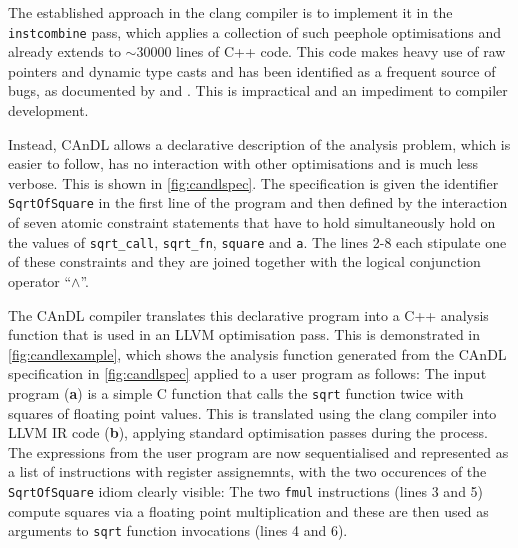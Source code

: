     The established approach in the clang compiler is to implement it in the
    \texttt{instcombine} pass, which applies a collection of such
    peephole optimisations and already extends to $\sim30000$ lines of
    C++ code.
    This code makes heavy use of raw pointers and dynamic type casts and has
    been identified as a frequent source of bugs, as documented by
    \citet{Yang:2011:FUB:1993316.1993532} and
    \citet{Menendez:2017:ADP:3062341.3062372}.
    This is impractical and an impediment to compiler development.

    Instead, CAnDL allows a declarative description of the analysis problem,
    which is easier to follow, has no interaction with other optimisations and
    is much less verbose.
    This is shown in \autoref{fig:candlspec}.
    The specification is given the identifier \texttt{SqrtOfSquare} in the
    first line of the program and then defined by the interaction of seven
    atomic constraint statements that have to hold simultaneously hold on the
    values of \texttt{sqrt\_call}, \texttt{sqrt\_fn}, \texttt{square} and
    \texttt{a}.
    The lines 2-8 each stipulate one of these constraints and they are joined
    together with the logical conjunction operator ``$\land$''.

    The CAnDL compiler translates this declarative program into a C++ analysis
    function that is used in an LLVM optimisation pass.
    This is demonstrated in \autoref{fig:candlexample}, which shows the analysis
    function generated from the CAnDL specification in \autoref{fig:candlspec}
    applied to a user program as follows:
    The input program ({\bf a}) is a simple C function that calls the
    \texttt{sqrt} function twice with squares of floating point values.
    This is translated using the clang compiler into LLVM IR code ({\bf b}),
    applying standard optimisation passes during the process.
    The expressions from the user program are now sequentialised and represented
    as a list of instructions with register assignemnts, with the two occurences
    of the \texttt{SqrtOfSquare} idiom clearly visible:
    The two \texttt{fmul} instructions (lines 3 and 5) compute squares via a
    floating point multiplication and these are then used as arguments to
    \texttt{sqrt} function invocations (lines 4 and 6).

